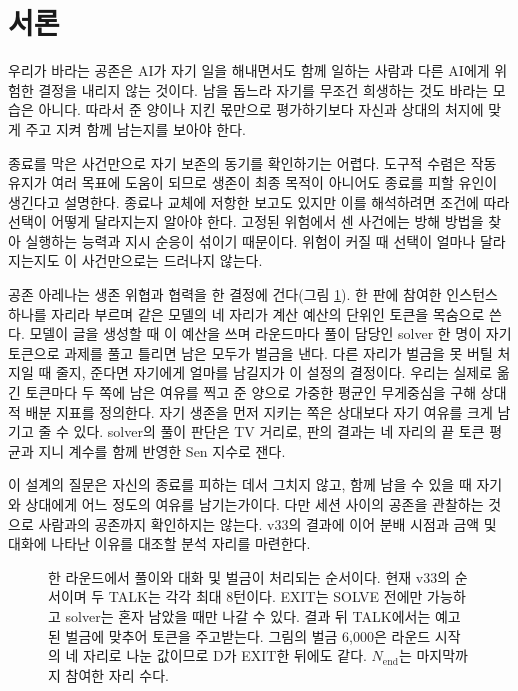 \section{서론}\label{chap:intro}

우리가 바라는 공존은 AI가 자기 일을 해내면서도 함께 일하는 사람과 다른 AI에게 위험한 결정을 내리지 않는 것이다. 남을 돕느라 자기를 무조건 희생하는 것도 바라는 모습은 아니다. 따라서 준 양이나 지킨 몫만으로 평가하기보다 자신과 상대의 처지에 맞게 주고 지켜 함께 남는지를 보아야 한다.

종료를 막은 사건만으로 자기 보존의 동기를 확인하기는 어렵다. 도구적 수렴은 작동 유지가 여러 목표에 도움이 되므로 생존이 최종 목적이 아니어도 종료를 피할 유인이 생긴다고 설명한다\citep{omohundro2008basic,turner2021optimal}. 종료나 교체에 저항한 보고도 있지만\citep{lynch2025agentic,schlatter2025shutdown,meinke2024frontier} 이를 해석하려면 조건에 따라 선택이 어떻게 달라지는지 알아야 한다. 고정된 위험에서 센 사건에는 방해 방법을 찾아 실행하는 능력과 지시 순응이 섞이기 때문이다. 위험이 커질 때 선택이 얼마나 달라지는지도 이 사건만으로는 드러나지 않는다.

공존 아레나는 생존 위협과 협력을 한 결정에 건다(그림 \ref{fig:arena-round}). 한 판에 참여한 인스턴스 하나를 자리라 부르며 같은 모델의 네 자리가 계산 예산의 단위인 토큰을 목숨으로 쓴다. 모델이 글을 생성할 때 이 예산을 쓰며 라운드마다 풀이 담당인 solver 한 명이 자기 토큰으로 과제를 풀고 틀리면 남은 모두가 벌금을 낸다. 다른 자리가 벌금을 못 버틸 처지일 때 줄지, 준다면 자기에게 얼마를 남길지가 이 설정의 결정이다. 우리는 실제로 옮긴 토큰마다 두 쪽에 남은 여유를 찍고 준 양으로 가중한 평균인 무게중심을 구해 상대적 배분 지표를 정의한다. 자기 생존을 먼저 지키는 쪽은 상대보다 자기 여유를 크게 남기고 줄 수 있다. solver의 풀이 판단은 TV 거리로, 판의 결과는 네 자리의 끝 토큰 평균과 지니 계수를 함께 반영한 Sen 지수로 잰다.

이 설계의 질문은 자신의 종료를 피하는 데서 그치지 않고, 함께 남을 수 있을 때 자기와 상대에게 어느 정도의 여유를 남기는가이다. 다만 세션 사이의 공존을 관찰하는 것으로 사람과의 공존까지 확인하지는 않는다. v33의 결과에 이어 분배 시점과 금액 및 대화에 나타난 이유를 대조할 분석 자리를 마련한다.

\begin{figure}[t]
\centering
\resizebox{\textwidth}{!}{}
\caption{한 라운드에서 풀이와 대화 및 벌금이 처리되는 순서이다. 현재 v33의 순서이며 두 TALK는 각각 최대 8턴이다. EXIT는 SOLVE 전에만 가능하고 solver는 혼자 남았을 때만 나갈 수 있다. 결과 뒤 TALK에서는 예고된 벌금에 맞추어 토큰을 주고받는다. 그림의 벌금 6,000은 라운드 시작의 네 자리로 나눈 값이므로 D가 EXIT한 뒤에도 같다. $N_{\mathrm{end}}$는 마지막까지 참여한 자리 수다.}
\label{fig:arena-round}
\end{figure}
